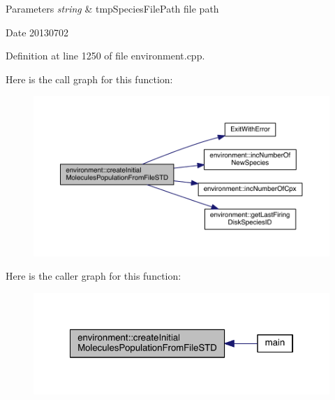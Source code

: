 \begin{DoxyParams}{Parameters}
{\em string} & tmp\-Species\-File\-Path file path \\
\hline
\end{DoxyParams}
\begin{DoxyDate}{Date}
20130702 
\end{DoxyDate}


Definition at line 1250 of file environment.\-cpp.



Here is the call graph for this function\-:\nopagebreak
\begin{figure}[H]
\begin{center}
\leavevmode
\includegraphics[width=350pt]{a00014_aee77384e63261db28ef5677844bdbaf6_cgraph}
\end{center}
\end{figure}




Here is the caller graph for this function\-:\nopagebreak
\begin{figure}[H]
\begin{center}
\leavevmode
\includegraphics[width=322pt]{a00014_aee77384e63261db28ef5677844bdbaf6_icgraph}
\end{center}
\end{figure}



